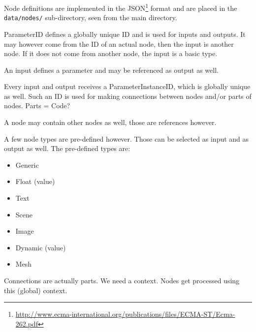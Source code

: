 \documentclass[10pt, openright, notitlepage]{scrreprt}
\begin{document}
Node definitions are implemented in the
JSON\footnote{\url{http://www.ecma-international.org/publications/files/ECMA-ST/Ecma-262.pdf}}
format and are placed in the \texttt{data/nodes/} sub-directory, seen from the main
directory.

ParameterID defines a globally unique ID and is used for inputs and outputs.
It may however come from the ID of an actual node, then the input is another node.
If it does not come from another node, the input is a basic type.

An input defines a parameter and may be referenced as output as well.

Every input and output receives a ParameterInstanceID, which is globally unique
as well. Such an ID is used for making connections between nodes and/or parts of
nodes. Parts = Code?

A node may contain other nodes as well, those are references however.

A few node types are pre-defined however. Those can be selected as input and as
output as well. The pre-defined types are:

\begin{itemize}
\item Generic
\item Float (value)
\item Text
\item Scene
\item Image
\item Dynamic (value)
\item Mesh
\end{itemize}

Connections are actually parts.
We need a context. Nodes get processed using this (global) context.
\end{document}
